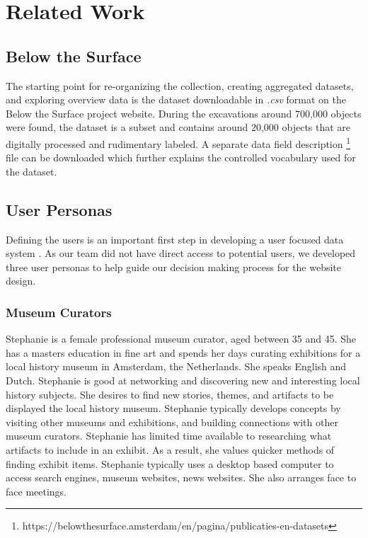 \section{Related Work}

\subsection{Below the Surface}

The starting point for re-organizing the collection, creating aggregated datasets, and exploring overview data is the dataset downloadable in \textit{.csv} format on the Below the Surface project website. During the excavations around 700,000 objects were found, the dataset is a subset and contains around 20,000 objects that are digitally processed and rudimentary labeled. A separate data field description \footnote{https://belowthesurface.amsterdam/en/pagina/publicaties-en-datasets} file can be downloaded which further explains the controlled vocabulary used for the dataset.

\subsection{User Personas}

Defining the users is an important first step in developing a user focused data system \cite{Just-RightPersonas}.  As our team did not have direct access to potential users, we developed three user personas to help guide our decision making process for the website design.  

\subsubsection{Museum Curators}

Stephanie is a female professional museum curator, aged between 35 and 45.  She has a masters education in fine art and spends her days curating exhibitions for a local history museum in Amsterdam, the Netherlands.  She speaks English and Dutch.  Stephanie is good at networking and discovering new and interesting local history subjects.  She desires to find new stories, themes, and artifacts to be displayed the local history museum.  Stephanie typically develops concepts by visiting other museums and exhibitions, and building connections with other museum curators.  Stephanie has limited time available to researching what artifacts to include in an exhibit. As a result, she values quicker methods of finding exhibit items.  Stephanie typically uses a desktop based computer to access search engines, museum websites, news websites.  She also arranges face to face meetings.

